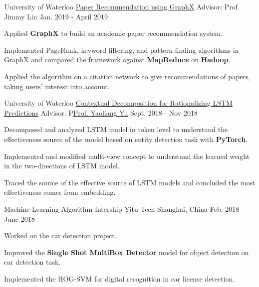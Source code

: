 \begin{cventries}
  \cventry
    {University of Waterloo}
    {{\href{https://github.com/amyxie361/CS651_Paper_recommendation}{\underline{Paper Recommendation using GraphX}}}} %
    {Advisor: Prof. Jimmy Lin} %
    {Jan. 2019 - April 2019} %
    {
      \begin{cvitems} %
        \item {Applied \textbf{GraphX} to build an academic paper recommendation system.}
        \item {Implemented PageRank, keyword filtering, and pattern finding algorithms in GraphX and compared the framework against \textbf{MapReduce} on \textbf{Hadoop}.}
        \item {Applied the algorithm on a citation network to give recommendations of papers, taking users’ interest into account. }
      \end{cvitems}
    }

\cventry
    {University of Waterloo}
    {{\href{https://github.com/amyxie361/CS886}{\underline{Contextual Decomposition for Rationalizing LSTM Predictions}}}} %
    {Advisor: P{\href{https://cs.uwaterloo.ca/~y328yu/}{\underline{Prof. Yaoliang Yu}}}} %
    {Sept. 2018 - Nov 2018} %
    {
      \begin{cvitems} %
        \item {Decomposed and analyzed LSTM model in token level to understand the effectiveness source of the model based on entity detection task with \textbf{PyTorch}.}
        \item {Implemented and modified multi-view concept to understand the learned weight in the two-directions of LSTM model.}
        \item {Traced the source of the effective source of LSTM models and concluded the most effectiveness comes from embedding.}
      \end{cvitems}
    }
    
    \cventry
    {Machine Learning Algorithm Intership} %
    {Yitu-Tech} %
    {Shanghai, China} %
    {Feb. 2018 - June 2018} %
    {
      \begin{cvitems} %
       \item {Worked on the car detection project.}
        \item {Improved the  \textbf{Single Shot MultiBox Detector} model for object detection on car detection task.}
        \item {Implemented the HOG-SVM for digital recognition in car license detection.}
      \end{cvitems}
    }
    

\end{cventries}
